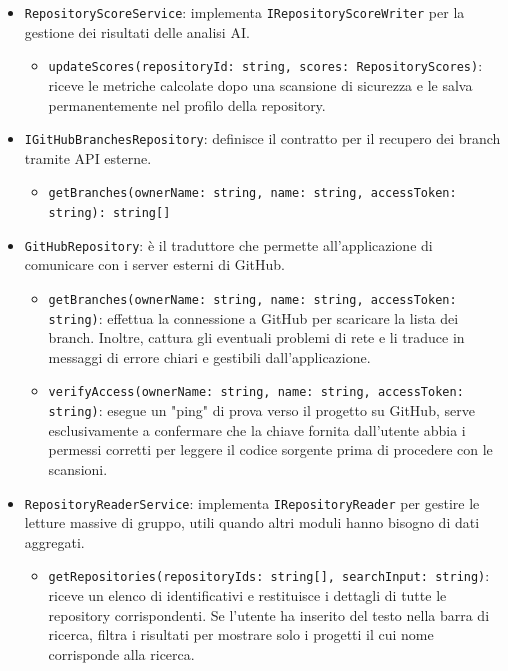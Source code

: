 \documentclass[a4paper, 11pt]{article}
\begin{document}
\begin{itemize}
\begin{itemize}
\begin{itemize}
          \item \texttt{toRepositoryEntity()}: è un metodo di supporto interno che serve a pulire i dati grezzi appena estratti da MongoDB per trasformarli in un formato semplice e standardizzato, in modo che il resto dell'applicazione non debba preoccuparsi di come il database salva fisicamente i documenti.
        \end{itemize}

      \item \texttt{RepositoryScoreService}: implementa \texttt{IRepositoryScoreWriter} per la gestione dei risultati delle analisi AI.
        \begin{itemize}
          \item \texttt{updateScores(repositoryId: string, scores: RepositoryScores)}: riceve le metriche calcolate dopo una scansione di sicurezza e le salva permanentemente nel profilo della repository.
        \end{itemize}

      \item \texttt{IGitHubBranchesRepository}: definisce il contratto per il recupero dei branch tramite API esterne.
        \begin{itemize}
          \item \texttt{getBranches(ownerName: string, name: string, accessToken: string): string[]} 
        \end{itemize}

      \item \texttt{GitHubRepository}: è il traduttore che permette all'applicazione di comunicare con i server esterni di GitHub.
        \begin{itemize}
          \item \texttt{getBranches(ownerName: string, name: string, accessToken: string)}: effettua la connessione a GitHub per scaricare la lista dei branch. Inoltre, cattura gli eventuali problemi di rete e li traduce in messaggi di errore chiari e gestibili dall'applicazione.

          \item \texttt{verifyAccess(ownerName: string, name: string, accessToken: string)}: esegue un "ping" di prova verso il progetto su GitHub, serve esclusivamente a confermare che la chiave fornita dall'utente abbia i permessi corretti per leggere il codice sorgente prima di procedere con le scansioni. 
        \end{itemize}

      \item \texttt{RepositoryReaderService}: implementa \texttt{IRepositoryReader} per gestire le letture massive di gruppo, utili quando altri moduli hanno bisogno di dati aggregati.
        \begin{itemize}
          \item \texttt{getRepositories(repositoryIds: string[], searchInput: string)}: riceve un elenco di identificativi e restituisce i dettagli di tutte le repository corrispondenti. Se l'utente ha inserito del testo nella barra di ricerca, filtra i risultati per mostrare solo i progetti il cui nome corrisponde alla ricerca.
        \end{itemize}


\end{itemize}
\end{itemize}
\end{document}
